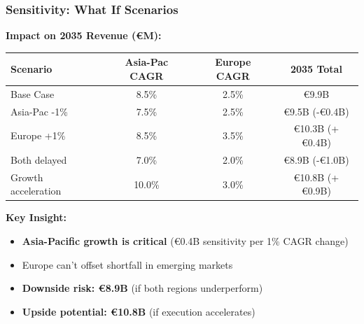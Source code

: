 \documentclass[aspectratio=169,12pt,xcolor=dvipsnames]{beamer}
\newcommand{\highlight}[1]{{\color{alpla_blue}\textbf{#1}}}
\begin{document}

\begin{frame}
  \frametitle{Sensitivity: What If Scenarios}

  \textbf{Impact on 2035 Revenue (€M):}

  \vspace{0.5cm}

  \begin{center}
    \small
    \begin{tabular}{|l|c|c|c|}
      \hline
      \textbf{Scenario} & \textbf{Asia-Pac CAGR} & \textbf{Europe CAGR} & \textbf{2035 Total} \\
      \hline
      Base Case & 8.5\% & 2.5\% & €9.9B \\
      \hline
      Asia-Pac -1\% & 7.5\% & 2.5\% & €9.5B (-€0.4B) \\
      \hline
      Europe +1\% & 8.5\% & 3.5\% & €10.3B (+€0.4B) \\
      \hline
      Both delayed & 7.0\% & 2.0\% & €8.9B (-€1.0B) \\
      \hline
      Growth acceleration & 10.0\% & 3.0\% & €10.8B (+€0.9B) \\
      \hline
    \end{tabular}
  \end{center}

  \vspace{0.8cm}

  \textbf{Key Insight:} \\

  \begin{itemize}
    \item \highlight{Asia-Pacific growth is critical} (€0.4B sensitivity per 1\% CAGR change)
    \item Europe can't offset shortfall in emerging markets
    \item \highlight{Downside risk: €8.9B} (if both regions underperform)
    \item \highlight{Upside potential: €10.8B} (if execution accelerates)
  \end{itemize}

\end{frame}

\end{document}
